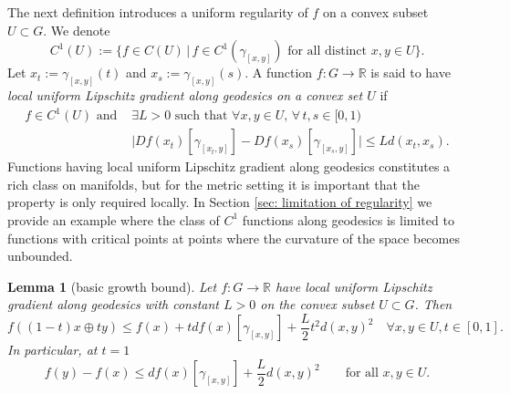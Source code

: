 \documentclass{article}
\theoremstyle{plain}\newtheorem{theorem}{Theorem}[section]
\theoremstyle{plain}\newtheorem{definition}[theorem]{Definition}
\theoremstyle{plain}\newtheorem{lemma}[theorem]{Lemma}
\theoremstyle{definition}\newtheorem{remark}[theorem]{Remark}
\theoremstyle{definition}\newtheorem{example}[theorem]{Example}
\theoremstyle{plain}\newtheorem{proposition}[theorem]{Proposition}
\theoremstyle{plain}\newtheorem{inference}[theorem]{Inference}
\theoremstyle{plain}\newtheorem{corollary}[theorem]{Corollary}
\theoremstyle{plain}\newtheorem{assumption}[theorem]{Assumption}
\begin{document}
The next definition introduces a uniform regularity of $f$ on a convex subset $U\subset G$. We denote
$$
C^1(U):=\bigl\{ f\in C(U) \,\big|\, f\in C^1(\gamma_{[x,y]})\,\,\text{for all distinct}\,\,x,y\in U \bigr\}.
$$
Let $x_t:=\gamma_{[x,y]}(t)$ and $x_s:=\gamma_{[x,y]}(s)$. A function $f:G\to\mathbb{R}$ is said to have {\em local uniform Lipschitz gradient along geodesics on a convex set $U$} if
\begin{equation}\label{eq: L-gradient}
    \begin{aligned}
        f\in C^1(U)\mbox{ and } &\exists L>0\,\,\text{such that}\,\,\forall x,y\in U,\,\forall\,t,s\in[0,1) \\
        &\bigl|Df(x_t)[\gamma_{[x_t,y]}]-Df(x_s)[\gamma_{[x_s,y]}]\bigr|\leq Ld(x_t,x_s).
    \end{aligned}
\end{equation}
Functions having local uniform Lipschitz gradient along geodesics constitutes a 
rich class on manifolds, but for the metric setting 
it is important that the property is only required locally. 
In Section \ref{sec: limitation of regularity} we provide an example where 
the class of $C^1$ functions along geodesics is limited to 
functions with critical points at points where the curvature of the space 
becomes unbounded.
\begin{lemma}[basic growth bound]\label{lm: bg bound}
    Let $f:G\to\mathbb{R}$ have local uniform Lipschitz gradient along geodesics with constant $L>0$ on the convex subset $U\subset G$. Then
    \begin{equation}\label{eq: bg bound}
        f((1-t)x\oplus ty)\leq f(x)+tdf(x)[\gamma_{[x,y]}]+\frac{L}{2}t^2d(x,y)^2\quad \forall x,y\in U, t\in[0,1].
    \end{equation}
    In particular, at $t=1$
    \begin{equation}\label{eq: L-smooth}
        f(y)-f(x)\leq df(x)[\gamma_{[x,y]}]+\frac{L}{2}d(x,y)^2 \qquad\text{for all}\,\,x,y\in U.
    \end{equation}
\end{lemma}
\end{document}
